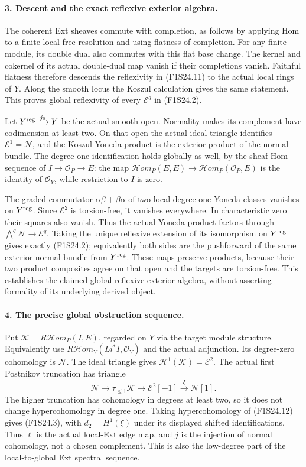 \paragraph{3. Descent and the exact reflexive exterior algebra.}
The coherent Ext sheaves commute with completion, as follows by
applying Hom to a finite local free resolution and using flatness
of completion. For any finite module, its double dual also commutes
with this flat base change. The kernel and cokernel of its actual
double-dual map vanish if their completions vanish. Faithful
flatness therefore descends the reflexivity in (F1S24.11) to the
actual local rings of $Y$. Along the smooth locus the Koszul
calculation gives the same statement. This proves global
reflexivity of every $\mathscr E^q$ in (F1S24.2).

Let $Y^{\rm reg}\xrightarrow{j_0}Y$ be the actual smooth open.
Normality makes its complement have codimension at least two.
On that open the actual ideal triangle identifies
$\mathscr E^1=\mathscr N$, and the Koszul Yoneda product is
the exterior product of the normal bundle. The degree-one
identification holds globally as well, by the sheaf Hom sequence
of $I\to\mathcal O_P\to E$: the map
$\mathcal Hom_P(E,E)\to\mathcal Hom_P(\mathcal O_P,E)$
is the identity of $\mathcal O_Y$, while restriction to $I$ is zero.

The graded commutator $\alpha\beta+\beta\alpha$ of two local
degree-one Yoneda classes vanishes on $Y^{\rm reg}$.
Since $\mathscr E^2$ is torsion-free, it
vanishes everywhere. In characteristic zero their squares also
vanish. Thus the actual Yoneda product factors through
$\bigwedge^q\mathscr N\to\mathscr E^q$.
Taking the unique reflexive extension of its isomorphism on
$Y^{\rm reg}$ gives exactly (F1S24.2); equivalently both sides
are the pushforward of the same exterior normal bundle from
$Y^{\rm reg}$. These maps preserve products, because their two
product composites agree on that open and the targets are
torsion-free. This establishes the claimed global reflexive
exterior algebra, without asserting formality of its underlying
derived object.

\paragraph{4. The precise global obstruction sequence.}
Put $\mathcal K=R\mathcal Hom_P(I,E)$, regarded on $Y$ via the
target module structure. Equivalently use
$R\mathcal Hom_Y(Li^*I,\mathcal O_Y)$ and the actual adjunction.
Its degree-zero cohomology is $\mathscr N$. The ideal triangle
gives $\mathcal H^1(\mathcal K)=\mathscr E^2$.
The actual first Postnikov truncation has triangle
\[
 \mathscr N\longrightarrow\tau_{\le1}\mathcal K
       \longrightarrow\mathscr E^2[-1]
       \xrightarrow{\xi}\mathscr N[1].
 \tag{F1S24.12}
\]
The higher truncation has cohomology in degrees at least two,
so it does not change hypercohomology in degree one. Taking
hypercohomology of (F1S24.12) gives (F1S24.3), with
$d_2=H^1(\xi)$ under its displayed shifted identifications.
Thus $\ell$ is the actual local-Ext edge map, and $j$ is the
injection of normal cohomology, not a chosen complement.
This is also the low-degree part of the local-to-global Ext
spectral sequence.

